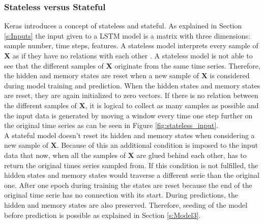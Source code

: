 \subsubsection{Stateless versus Stateful}
Keras introduces a concept of stateless and stateful. As explained in Section \ref{s:Inputs} the input given to a LSTM model is a matrix with three dimensions: sample number, time steps, features. A stateless model interprets every sample of $ \bm{X} $ as if they have no relations with each other \cite{FneishMo}. A stateless model is not able to see that the different samples of $ \bm{X} $ originate from the same time series. Therefore, the hidden and memory states are reset when a new sample of $ \bm{X} $ is considered during model training and prediction. When the hidden states and memory states are reset, they are again initialized to zero vectors. If there is no relation between the different samples of $ \bm{X} $, it is logical to collect as many samples as possible and the input data is generated by moving a window every time one step further on the original time series as can be seen in Figure \ref{fig:stateless_input}.\\

A stateful model doesn't reset its hidden and memory states when considering a new sample of $ \bm{X} $. Because of this an additional condition is imposed to the input data that now, when all the samples of $ \bm{X} $ are glued behind each other, has to return the original times series sampled from. If this condition is not fulfilled, the hidden states and memory states would traverse a different serie than the original one. After one epoch during training the states are reset because the end of the original time serie has no connection with its start. During predictions, the hidden and memory states are also preserved. Therefore, seeding of the model before prediction is possible as explained in Section \ref{s:Model3}.\\

